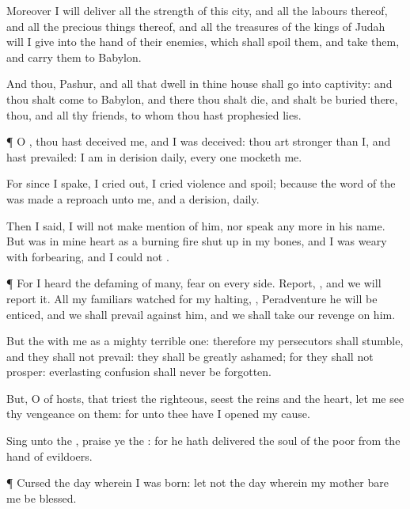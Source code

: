 {Moreover I will
deliver all the
strength of this
city, and all the
labours thereof, and all the precious
things thereof, and all the
treasures of the
kings of
Judah will I
give into the
hand of their
enemies, which shall
spoil them, and
take them, and
carry them to
Babylon.

And thou,
Pashur, and all that
dwell in thine
house shall
go into
captivity: and thou shalt
come to
Babylon, and there thou shalt
die, and shalt be
buried there, thou, and all thy
friends, to whom thou hast
prophesied
lies.


\par }{\PP {}¶ O
{}, thou hast
deceived me, and I was
deceived: thou art
stronger than I, and hast
prevailed: I am in
derision
daily, every one
mocketh me.

For
since I
spake, I cried
out, I
cried
violence and
spoil; because the
word of the
{} was made a
reproach unto me, and a
derision,
daily.

Then I
said, I will not make
mention of him, nor
speak any more in his
name. But
{} was in mine
heart as a
burning
fire shut
up in my
bones, and I was
weary with
forbearing, and I
could not
{}.


\par }{\PP {}¶ For I
heard the
defaming of
many,
fear on every
side.
Report,
{}, and we will
report it. All my
familiars
watched for my
halting,
{}, Peradventure he will be
enticed, and we shall
prevail against him, and we shall
take our
revenge on him.

But the
{}
{} with me as a
mighty terrible
one: therefore my
persecutors shall
stumble, and they shall not
prevail: they shall be
greatly
ashamed; for they shall not
prosper:
{}
everlasting
confusion shall never be
forgotten.

But, O
{} of
hosts, that
triest the
righteous,
{}
seest the
reins and the
heart, let me
see thy
vengeance on them: for unto thee have I
opened my
cause.

Sing unto the
{},
praise ye the
{}: for he hath
delivered the
soul of the
poor from the
hand of
evildoers.


\par }{\PP {}¶
Cursed
{} the
day wherein I was
born: let not the
day wherein my
mother
bare me be
blessed.

}
